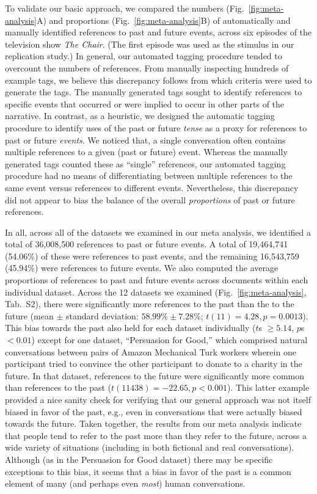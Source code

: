 \documentclass[10pt]{article}
\newcommand{\metaTable}{S2}
\begin{document}
To validate our basic approach, we compared the numbers
(Fig.~\ref{fig:meta-analysis}A) and proportions (Fig.~\ref{fig:meta-analysis}B)
of automatically and manually identified references to past and future events,
across six episodes of the television show \textit{The Chair}. (The first
episode was used as the stimulus in our replication study.) In general, our
automated tagging procedure tended to overcount the numbers of references. From
manually inspecting hundreds of example tags, we believe this discrepancy
follows from which criteria were used to generate the tags. The manually
generated tags sought to identify references to specific events that occurred
or were implied to occur in other parts of the narrative. In contrast, as a
heuristic, we designed the automatic tagging procedure to identify uses of the
past or future \textit{tense} as a proxy for references to past or future
\textit{events}. We noticed that, a single conversation often contains multiple
references to a given (past or future) event. Whereas the manually generated
tags counted these as ``single'' references, our automated tagging procedure
had no means of differentiating between multiple references to the same event
versus references to different events. Nevertheless, this discrepancy did not
appear to bias the balance of the overall \textit{proportions} of past or
future references.

In all, across all of the datasets we examined in our meta analysis, we
identified a total of 36,008,500 references to past or future events. A total
of 19,464,741 (54.06\%) of these were references to past events, and the
remaining 16,543,759 (45.94\%) were references to future events. We also
computed the average proportions of references to past and future events across
documents within each individual dataset. Across the 12 datasets we examined
(Fig.~\ref{fig:meta-analysis}, Tab.~\metaTable), there were significantly more
references to the past than the to the future (mean $\pm$ standard deviation:
$58.99\% \pm 7.28\%$; $t(11) = 4.28, p = 0.0013$). This bias towards the past
also held for each dataset individually ($t$s $\geq 5.14$, $p$s $< 0.01$)
except for one dataset, ``Persuasion for Good,'' which comprised natural
conversations between pairs of Amazon Mechanical Turk workers wherein one
participant tried to convince the other participant to donate to a charity in
the future. In that dataset, references to the future were significantly more
common than references to the past ($t(11438) = -22.65, p < 0.001$). This
latter example provided a nice sanity check for verifying that our general
approach was not itself biased in favor of the past, e.g., even in
conversations that were actually biased towards the future. Taken together, the
results from our meta analysis indicate that people tend to refer to the past
more than they refer to the future, across a wide variety of situations
(including in both fictional and real conversations). Although (as in the
Persuasion for Good dataset) there may be specific exceptions to this bias, it
seems that a bias in favor of the past is a common element of many (and perhaps
even \textit{most}) human conversations.
\end{document}
